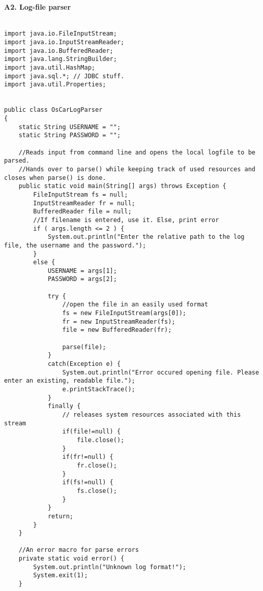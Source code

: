 \paragraph{A2. Log-file parser}
\begin{lstlisting}

import java.io.FileInputStream;
import java.io.InputStreamReader;
import java.io.BufferedReader;
import java.lang.StringBuilder;
import java.util.HashMap;
import java.sql.*; // JDBC stuff.
import java.util.Properties;


public class OsCarLogParser
{
    static String USERNAME = "";
    static String PASSWORD = "";

    //Reads input from command line and opens the local logfile to be parsed.
    //Hands over to parse() while keeping track of used resources and closes when parse() is done.
    public static void main(String[] args) throws Exception {
        FileInputStream fs = null;
        InputStreamReader fr = null;
        BufferedReader file = null;
        //If filename is entered, use it. Else, print error
        if ( args.length <= 2 ) {
            System.out.println("Enter the relative path to the log file, the username and the password.");
        }
        else {
            USERNAME = args[1];
            PASSWORD = args[2];
		
            try {
                //open the file in an easily used format
                fs = new FileInputStream(args[0]);
                fr = new InputStreamReader(fs);
                file = new BufferedReader(fr);
			
                parse(file);
            }
            catch(Exception e) {
                System.out.println("Error occured opening file. Please enter an existing, readable file.");
                e.printStackTrace();
            }
            finally {
                // releases system resources associated with this stream
                if(file!=null) {
                    file.close();
                }
                if(fr!=null) {
                    fr.close();
                }
                if(fs!=null) {
                    fs.close();
                }	
            }
            return;
        }
    }

    //An error macro for parse errors
    private static void error() {
        System.out.println("Unknown log format!");
        System.exit(1);
    }


\end{lstlisting}
